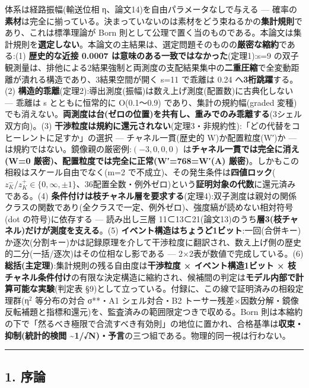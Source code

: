 \documentclass[
]{ltjsarticle}
\begin{document}
体系は経路振幅(輸送位相 η、論文14)を自由パラメータなしで与える ---
確率の\textbf{素材}は完全に揃っている。決まっていないのは素材をどう束ねるかの\textbf{集計規則}であり、これは標準理論が
Born
則として公理で置く当のものである。本論文は集計規則を\textbf{選定しない}。本論文の主結果は、選定問題そのものの\textbf{厳密な縮約}である:(1)
\textbf{歴史的な近接 0.0007 は意味のある一致ではなかった}(定理1):s=9
の双子観測量は、排他による2結果強制と両測度の支配結果集中の\textbf{二重圧縮}で全変動距離が潰れる構造であり、3結果空間が開く
s=11 で乖離は 0.24 へ\textbf{3桁跳躍}する。(2)
\textbf{構造的乖離}(定理2):導出測度(振幅)は数え上げ測度(配置数)に古典化しない
--- 乖離は s とともに恒常的に O(0.1〜0.9) であり、集計の規約幅(graded
変種)でも消えない。\textbf{両測度は台(ゼロの位置)を共有し、重みでのみ乖離する}(3シェル双方向)。(3)
\textbf{干渉粒度は規約に還元されない}(定理3・非規約性):「どの代替をコヒーレントに足すか」の選択
--- チャネル一貫(歴史的 W)か配置粒度(W′)か ---
は規約ではない。鏡像親の厳密例:\((-3,0,0,0)\)
は\textbf{チャネル一貫では完全に消え(W=0
厳密)、配置粒度では完全に正常(W′=768=W′(A)
厳密)}。しかもこの相殺はスケール自由でなく(m=2
で不成立)、その発生条件は\textbf{四値ロック}(\(z^-_K/z^+_K\in\{0,\infty,\pm1\}\)、36配置全数・例外ゼロ)という\textbf{証明対象の代数}に還元済みである。(4)
\textbf{条件付けは枝チャネル層を要求する}(定理4):双子測度は親対の関係クラスの関数であり(全クラスで一定、例外ゼロ)、強度縞が読めない相対符号(dot
の符号)に依存する --- 読み出し三層
11⊂13⊂21(論文13)のうち\textbf{層3(枝チャネル)だけが測度を支える}。(5)
\textbf{イベント構造はちょうど1ビット}:一回(合併キー)か逐次(分割キー)かは記録原理を介して干渉粒度に翻訳され、数え上げ側の歴史的二分(一括/逐次)はその位相なし影である
--- 2×2表が数値で完成している。(6)
\textbf{総括(主定理)}:集計規則の残る自由度は\textbf{干渉粒度 ×
イベント構造1ビット ×
枝チャネル条件付け}の有限な決定構造に縮約され、候補間の判定は\textbf{モデル内部で計算可能な実験}(判定表
§9)として立っている。付録に、この線で証明済みの相殺定理群(η\(^{2}\)
等分布の対合 σ**・A1 シェル対合・B2
トーサー残差×因数分解・鏡像反転補題と指標和還元)を、監査済みの範囲限定つきで収める。Born
則は本縮約の下で「然るべき極限で合流すべき有効則」の地位に置かれ、合格基準は\textbf{収束・抑制(統計的検閲
\textasciitilde1/√N)・予言}の三つ組である。物理的同一視は行わない。

\begin{center}\rule{0.5\linewidth}{0.5pt}\end{center}

\subsection{1. 序論}\label{ux5e8fux8ad6}
\end{document}
